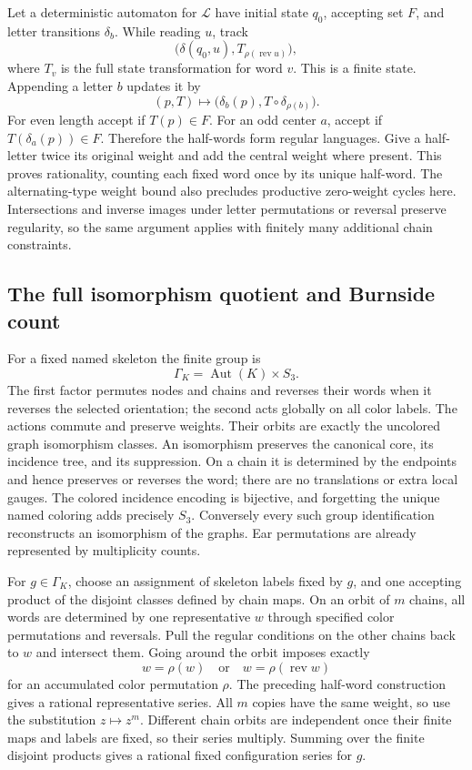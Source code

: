 Let a deterministic automaton for $\mathcal L$ have initial state
$q_0$, accepting set $F$, and letter transitions $\delta_b$.
While reading $u$, track
\[
 \bigl(\delta(q_0,u),T_{\rho(\operatorname{rev}u)}\bigr),
\]
where $T_v$ is the full state transformation for word $v$.  This
is a finite state.  Appending a letter $b$ updates it by
\begin{equation}
 (p,T)\longmapsto
 \bigl(\delta_b(p),T\circ\delta_{\rho(b)}\bigr).
 \label{eq:rational-half-update}
\end{equation}
For even length accept if $T(p)\in F$.  For an odd center $a$,
accept if $T(\delta_a(p))\in F$.  Therefore the half-words form
regular languages.  Give a half-letter twice its original weight
and add the central weight where present.  This proves rationality,
counting each fixed word once by its unique half-word.  The
alternating-type weight bound also precludes productive zero-weight
cycles here.  Intersections and inverse images under letter
permutations or reversal preserve regularity, so the same argument
applies with finitely many additional chain constraints.

\subsection{The full isomorphism quotient and Burnside count}

For a fixed named skeleton the finite group is
\[
 \Gamma_K=\operatorname{Aut}(K)\times S_3.
\]
The first factor permutes nodes and chains and reverses their words
when it reverses the selected orientation; the second acts globally
on all color labels.  The actions commute and preserve weights.
Their orbits are exactly the uncolored graph isomorphism classes.
An isomorphism preserves the canonical core, its incidence tree,
and its suppression.  On a chain it is determined by the endpoints
and hence preserves or reverses the word; there are no translations
or extra local gauges.  The colored incidence encoding is bijective,
and forgetting the unique named coloring adds precisely $S_3$.
Conversely every such group identification reconstructs an
isomorphism of the graphs.  Ear permutations are already represented
by multiplicity counts.

For $g\in\Gamma_K$, choose an assignment of skeleton labels fixed by $g$,
and one accepting product of the disjoint classes defined by chain maps. On
an orbit of $m$ chains, all words are determined by one representative
$w$ through specified color permutations and reversals.  Pull the
regular conditions on the other chains back to $w$ and intersect
them.  Going around the orbit imposes exactly
\[
 w=\rho(w)\quad\text{or}\quad
 w=\rho(\operatorname{rev}w)
\]
for an accumulated color permutation $\rho$.  The preceding
half-word construction gives a rational representative series.
All $m$ copies have the same weight, so use the substitution
$z\mapsto z^m$.  Different chain orbits are independent once
their finite maps and labels are fixed, so their series multiply.
Summing over the finite disjoint products gives a rational fixed
configuration series for $g$.

